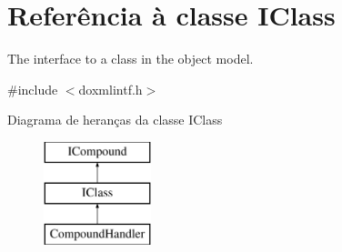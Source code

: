 \hypertarget{class_i_class}{\section{Referência à classe I\-Class}
\label{class_i_class}
}


The interface to a class in the object model.  




{\ttfamily \#include $<$doxmlintf.\-h$>$}

Diagrama de heranças da classe I\-Class\begin{figure}[H]
\begin{center}
\leavevmode
\includegraphics[height=3.000000cm]{class_i_class}
\end{center}
\end{figure}
